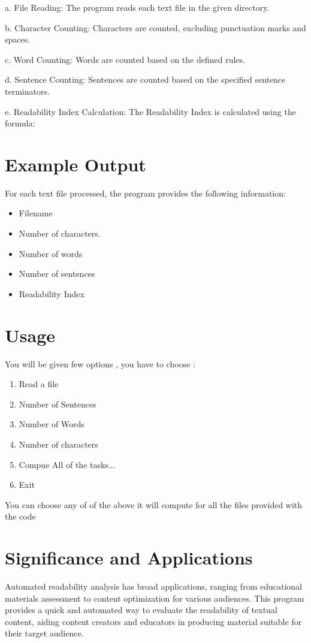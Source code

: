 \documentclass{article}
\begin{document}
a. File Reading: The program reads each text file in the given directory.


b. Character Counting: Characters are counted, excluding punctuation marks and spaces.


c. Word Counting: Words are counted based on the defined rules.


d. Sentence Counting: Sentences are counted based on the specified sentence terminators.


e. Readability Index Calculation: The Readability Index is calculated using the formula:

\section{Example Output}
For each text file processed, the program provides the following information:
 \begin{itemize}
\item Filename
\item Number of characters.
\item Number of words
\item Number of sentences
\item Readability Index
 \end{itemize}


\section{Usage}
You will be given few options , you have to choose : 
\begin{enumerate}
\item Read a file
\item Number of Sentences
\item Number of Words
\item Number of characters 
\item Compue All of the tasks...
\item Exit
\end{enumerate}
You can choose any of of the above it will compute for all the files provided with the code 
\section{Significance and Applications}

Automated readability analysis has broad applications, ranging from educational materials assessment to content optimization for various audiences. This program provides a quick and automated way to evaluate the readability of textual content, aiding content creators and educators in producing material suitable for their target audience.
\end{document}
